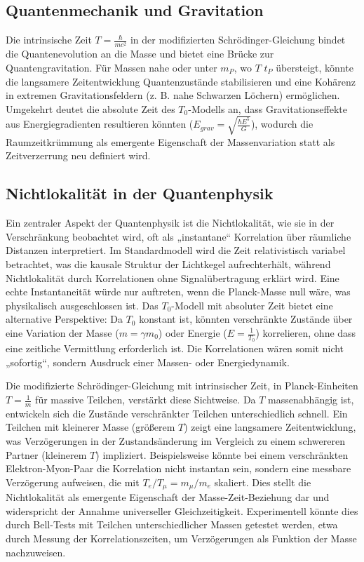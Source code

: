 \documentclass[a4paper,12pt]{article}
\begin{document}
	\subsection{Quantenmechanik und Gravitation}
	Die intrinsische Zeit \( T = \frac{\hbar}{m c^2} \) in der modifizierten Schrödinger-Gleichung bindet die Quantenevolution an die Masse und bietet eine Brücke zur Quantengravitation. Für Massen nahe oder unter \( m_P \), wo \( T \) \( t_P \) übersteigt, könnte die langsamere Zeitentwicklung Quantenzustände stabilisieren und eine Kohärenz in extremen Gravitationsfeldern (z. B. nahe Schwarzen Löchern) ermöglichen. Umgekehrt deutet die absolute Zeit des \( T_0 \)-Modells an, dass Gravitationseffekte aus Energiegradienten resultieren könnten (\( E_{grav} = \sqrt{\frac{\hbar E^5}{G}} \)), wodurch die Raumzeitkrümmung als emergente Eigenschaft der Massenvariation statt als Zeitverzerrung neu definiert wird.
	
	\subsection{Nichtlokalität in der Quantenphysik}
	Ein zentraler Aspekt der Quantenphysik ist die Nichtlokalität, wie sie in der Verschränkung beobachtet wird, oft als „instantane“ Korrelation über räumliche Distanzen interpretiert. Im Standardmodell wird die Zeit relativistisch variabel betrachtet, was die kausale Struktur der Lichtkegel aufrechterhält, während Nichtlokalität durch Korrelationen ohne Signalübertragung erklärt wird. Eine echte Instantaneität würde nur auftreten, wenn die Planck-Masse null wäre, was physikalisch ausgeschlossen ist. Das \( T_0 \)-Modell mit absoluter Zeit bietet eine alternative Perspektive: Da \( T_0 \) konstant ist, könnten verschränkte Zustände über eine Variation der Masse (\( m = \gamma m_0 \)) oder Energie (\( E = \frac{1}{T_0} \)) korrelieren, ohne dass eine zeitliche Vermittlung erforderlich ist. Die Korrelationen wären somit nicht „sofortig“, sondern Ausdruck einer Massen- oder Energiedynamik.
	
	Die modifizierte Schrödinger-Gleichung mit intrinsischer Zeit, in Planck-Einheiten \( T = \frac{1}{m} \) für massive Teilchen, verstärkt diese Sichtweise. Da \( T \) massenabhängig ist, entwickeln sich die Zustände verschränkter Teilchen unterschiedlich schnell. Ein Teilchen mit kleinerer Masse (größerem \( T \)) zeigt eine langsamere Zeitentwicklung, was Verzögerungen in der Zustandsänderung im Vergleich zu einem schwereren Partner (kleinerem \( T \)) impliziert. Beispielsweise könnte bei einem verschränkten Elektron-Myon-Paar die Korrelation nicht instantan sein, sondern eine messbare Verzögerung aufweisen, die mit \( T_e / T_\mu = m_\mu / m_e \) skaliert. Dies stellt die Nichtlokalität als emergente Eigenschaft der Masse-Zeit-Beziehung dar und widerspricht der Annahme universeller Gleichzeitigkeit. Experimentell könnte dies durch Bell-Tests mit Teilchen unterschiedlicher Massen getestet werden, etwa durch Messung der Korrelationszeiten, um Verzögerungen als Funktion der Masse nachzuweisen.
	
\end{document}
